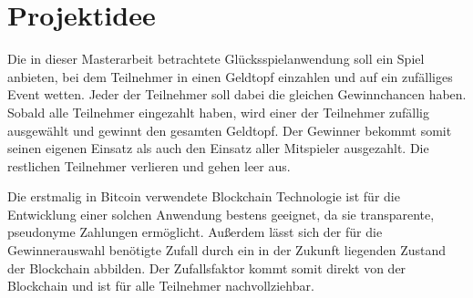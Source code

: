 





\section{Projektidee}

Die in dieser Masterarbeit betrachtete Glücksspielanwendung soll ein Spiel anbieten, bei dem Teilnehmer in einen Geldtopf einzahlen und auf ein zufälliges Event wetten. Jeder der Teilnehmer soll dabei die gleichen Gewinnchancen haben. Sobald alle Teilnehmer eingezahlt haben, wird einer der Teilnehmer zufällig ausgewählt und gewinnt den gesamten Geldtopf. Der Gewinner bekommt somit seinen eigenen Einsatz als auch den Einsatz aller Mitspieler ausgezahlt. Die restlichen Teilnehmer verlieren und gehen leer aus.

Die erstmalig in Bitcoin verwendete Blockchain Technologie ist für die Entwicklung einer solchen Anwendung bestens geeignet, da sie transparente, pseudonyme Zahlungen ermöglicht. Außerdem lässt sich der für die Gewinnerauswahl benötigte Zufall durch ein in der Zukunft liegenden Zustand der Blockchain abbilden. 
Der Zufallsfaktor kommt somit direkt von der Blockchain und ist für alle Teilnehmer nachvollziehbar.

